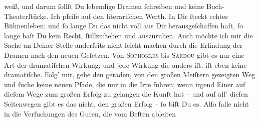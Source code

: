                weiß, und darum{ }ſollſt Du {\pb}lebendige Dramen{ }ſchreiben und keine Buch-Theaterſtücke. Ich pfeife auf den literariſchen Werth. In
               Dir{ }ſteckt echtes Bühnenleben; und{ }ſo lange Du das nicht voll aus Dir
               herausgeſchaffen haſt,{ }ſo lange haſt Du kein Recht,{ }ſtillzuſtehen und auszuruhen.
               Auch möchte ich mir die Sache an Deiner Stelle anderſeits nicht leicht machen durch
               die Erfindung der Dramen nach den neuen Geſetzen. Von \textsc{Sophokles} bis \textsc{Sardou} gibt es nur eine Art der dramatiſchen Wirkung; und jede Wirkung die anders iſt,
               iſt eben keine dramatiſche. Folg’ mir, gehe den geraden, von den großen Meiſtern
               gezeigten Weg und{ }ſuche keine neuen Pfade, die nur in die Irre führen; wenn irgend
               Einer auf dieſem Wege zum großen Erfolg zu gelangen die Kunſt hat – und auf all’
               dieſen Seitenwegen gibt es das nicht, den großen Erfolg –{ }ſo biſt Du es. Alſo falle
               nicht in {\pb}die Verſuchungen des Guten, die vom Beſten
                  ableiten{\dotsfive}\pend
           
